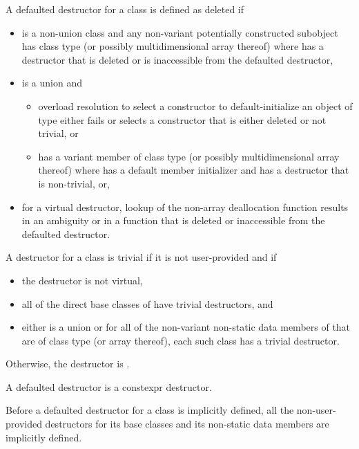 \pnum
A defaulted destructor for a class
   is defined as deleted if
\begin{itemize}
\item {} is a non-union class and
  any non-variant potentially constructed subobject has class type
   (or possibly multidimensional array thereof) where
   has a destructor that is deleted or
  is inaccessible from the defaulted destructor,

\item
   is a union and
  \begin{itemize}
  \item
    overload resolution to select a constructor to
    default-initialize an object of type  either fails or
    selects a constructor that is either deleted or not trivial, or
  \item
     has a variant member  of
    class type  (or possibly multidimensional array thereof)
    where  has a default member initializer and
     has a destructor that is non-trivial, or,
  \end{itemize}

\item for a virtual destructor, lookup of the non-array deallocation
  function results in an ambiguity or in a function that is deleted or
  inaccessible from the defaulted destructor.
\end{itemize}

\pnum
A destructor for a class  is trivial if it is not user-provided and if
\begin{itemize}
\item the destructor is not virtual,

\item all of the direct base classes of  have trivial destructors, and

\item either  is a union or
for all of the non-variant non-static data members of  that are of class
type (or array thereof), each such class has a trivial destructor.
\end{itemize}

Otherwise, the destructor is
.

\pnum
A defaulted destructor is a constexpr destructor.

\pnum
Before a
defaulted destructor for a class is implicitly defined, all the non-user-provided
destructors for its base classes and its non-static data members are
implicitly defined.

